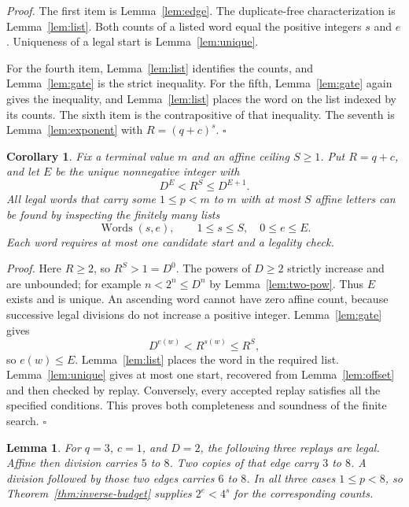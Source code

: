 \documentclass[11pt,letterpaper]{article}
\newtheorem{lemma}[theorem]{Lemma}
\newtheorem{corollary}[theorem]{Corollary}
\newenvironment{proof}{\noindent\textit{Proof.}}{\hfill\(\square\)}
\begin{document}
\begin{proof}
The first item is Lemma~\ref{lem:edge}. The duplicate-free characterization is Lemma~\ref{lem:list}. Both counts of a listed word equal the positive integers \(s\) and \(e\). Uniqueness of a legal start is Lemma~\ref{lem:unique}.

For the fourth item, Lemma~\ref{lem:list} identifies the counts, and Lemma~\ref{lem:gate} is the strict inequality. For the fifth, Lemma~\ref{lem:gate} again gives the inequality, and Lemma~\ref{lem:list} places the word on the list indexed by its counts. The sixth item is the contrapositive of that inequality. The seventh is Lemma~\ref{lem:exponent} with \(R=(q+c)^s\).
\end{proof}

\begin{corollary}
\label{cor:fixed-depth}
Fix a terminal value \(m\) and an affine ceiling \(S\ge1\). Put \(R=q+c\),
and let \(E\) be the unique nonnegative integer with
\[
D^E<R^S\le D^{E+1}.
\]
All legal words that carry some \(1\le p<m\) to \(m\) with at most
\(S\) affine letters can be found by inspecting the finitely many lists
\[
\operatorname{Words}(s,e),\qquad 1\le s\le S,\quad 0\le e\le E.
\]
Each word requires at most one candidate start and a legality check.
\end{corollary}

\begin{proof}
Here \(R\ge2\), so \(R^S>1=D^0\). The powers of \(D\ge2\) strictly
increase and are unbounded; for example
\(n<2^n\le D^n\) by Lemma~\ref{lem:two-pow}. Thus \(E\) exists and is unique.
An ascending word cannot have zero affine count, because successive
legal divisions do not increase a positive integer. Lemma~\ref{lem:gate}
gives
\[
D^{e(w)}<R^{s(w)}\le R^S,
\]
so \(e(w)\le E\). Lemma~\ref{lem:list} places the word in the required
list. Lemma~\ref{lem:unique} gives at most one start, recovered from
Lemma~\ref{lem:offset} and then checked by replay. Conversely, every
accepted replay satisfies all the specified conditions. This proves
both completeness and soundness of the finite search.
\end{proof}

\begin{lemma}
\label{lem:examples}
For \(q=3\), \(c=1\), and \(D=2\), the following three replays are legal. Affine then division carries \(5\) to \(8\). Two copies of that edge carry \(3\) to \(8\). A division followed by those two edges carries \(6\) to \(8\). In all three cases \(1\le p<8\), so Theorem~\ref{thm:inverse-budget} supplies \(2^e<4^s\) for the corresponding counts.
\end{lemma}
\end{document}
